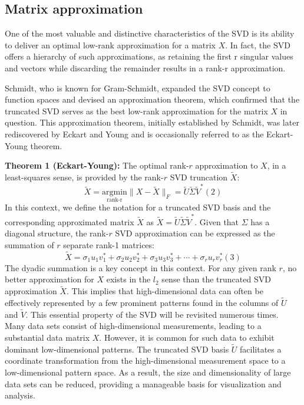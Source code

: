 \documentclass[a4paper]{article}
\begin{document}
{		\newpage
		\subsection{Matrix approximation}
		One of the most valuable and distinctive characteristics of the SVD is its ability to deliver an optimal low-rank approximation for a matrix $X$. In fact, the SVD offers a hierarchy of such approximations, as retaining the first r singular values and vectors while discarding the remainder results in a rank-r approximation. 
		
		Schmidt, who is known for Gram-Schmidt, expanded the SVD concept to function spaces and devised an approximation theorem, which confirmed that the truncated SVD serves as the best low-rank approximation for the matrix $X$ in question. This approximation theorem, initially established by Schmidt, was later rediscovered by Eckart and Young and is occasionally referred to as the Eckart-Young theorem.
		
		\textbf{Theorem 1 (Eckart-Young):} The optimal rank-$r$ approximation to $X$, in a least-squares sense, is provided by the rank-$r$ SVD truncation $\tilde{X}$:
		\[
		\tilde{X} = \underset{\text{rank-r}}{\mathrm{argmin}} \lVert X - \tilde{X} \rVert_F = \tilde{U} \tilde{\Sigma} \tilde{V}^{*} (2)
		\]
		In this context, we define the notation for a truncated SVD basis and the corresponding approximated matrix $\tilde{X}$ as $\tilde{X} = \tilde{U} \tilde{\Sigma} \tilde{V}^{*}$. Given that $\Sigma$ has a diagonal structure, the rank-$r$ SVD approximation can be expressed as the summation of $r$ separate rank-1 matrices:
		\[
		\tilde{X} = \sigma_1 u_1 v_1^* + \sigma_2 u_2 v_2^* + \sigma_3 u_3 v_3^* + \cdots + \sigma_r u_r v_r^* (3)
		\]
		The dyadic summation is a key concept in this context. For any given rank $r$, no better approximation for $X$ exists in the $l_2$ sense than the truncated SVD approximation $\tilde{X}$. This implies that high-dimensional data can often be effectively represented by a few prominent patterns found in the columns of $\tilde{U}$ and $\tilde{V}$. This essential property of the SVD will be revisited numerous times. Many data sets consist of high-dimensional measurements, leading to a substantial data matrix $X$. However, it is common for such data to exhibit dominant low-dimensional patterns. The truncated SVD basis $\tilde{U}$ facilitates a coordinate transformation from the high-dimensional measurement space to a low-dimensional pattern space. As a result, the size and dimensionality of large data sets can be reduced, providing a manageable basis for visualization and analysis.
		\newpage
}
\end{document}

